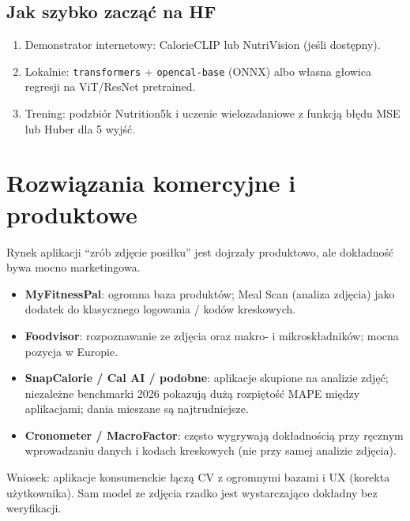 \documentclass[11pt,a4paper]{article}
\begin{document}
\subsection{Jak szybko zacząć na HF}
\begin{enumerate}[leftmargin=*]
  \item Demonstrator internetowy: CalorieCLIP lub NutriVision (jeśli dostępny).
  \item Lokalnie: \texttt{transformers} + \texttt{opencal-base} (ONNX)
        albo własna głowica regresji na ViT/ResNet pretrained.
  \item Trening: podzbiór Nutrition5k i uczenie wielozadaniowe
        z funkcją błędu MSE lub Huber dla 5 wyjść.
\end{enumerate}

\section{Rozwiązania komercyjne i produktowe}

Rynek aplikacji ``zrób zdjęcie posiłku'' jest dojrzały produktowo,
ale dokładność bywa mocno marketingowa.

\begin{itemize}[leftmargin=*]
  \item \textbf{MyFitnessPal}: ogromna baza produktów; Meal Scan (analiza zdjęcia)
        jako dodatek do klasycznego logowania / kodów kreskowych.
  \item \textbf{Foodvisor}: rozpoznawanie ze zdjęcia oraz makro- i mikroskładników;
        mocna pozycja w Europie.
  \item \textbf{SnapCalorie / Cal AI / podobne}: aplikacje skupione na analizie zdjęć;
        niezależne benchmarki 2026 pokazują dużą rozpiętość MAPE między aplikacjami;
        dania mieszane są najtrudniejsze.
  \item \textbf{Cronometer / MacroFactor}: często wygrywają dokładnością
        przy ręcznym wprowadzaniu danych i kodach kreskowych
        (nie przy samej analizie zdjęcia).
\end{itemize}

Wniosek: aplikacje konsumenckie łączą CV z ogromnymi bazami i UX
(korekta użytkownika). Sam model ze zdjęcia rzadko jest wystarczająco
dokładny bez weryfikacji.

\end{document}
